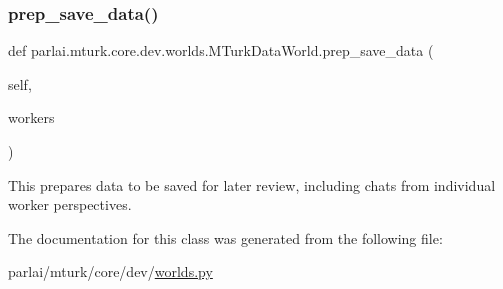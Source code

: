 \subsubsection{\texorpdfstring{prep\+\_\+save\+\_\+data()}{prep\_save\_data()}}
{\footnotesize\ttfamily def parlai.\+mturk.\+core.\+dev.\+worlds.\+M\+Turk\+Data\+World.\+prep\+\_\+save\+\_\+data (\begin{DoxyParamCaption}\item[{}]{self,  }\item[{}]{workers }\end{DoxyParamCaption})}

\begin{DoxyVerb}This prepares data to be saved for later review, including chats from individual
worker perspectives.
\end{DoxyVerb}
 

The documentation for this class was generated from the following file\+:\begin{DoxyCompactItemize}
\item 
parlai/mturk/core/dev/\hyperlink{parlai_2mturk_2core_2dev_2worlds_8py}{worlds.\+py}\end{DoxyCompactItemize}
